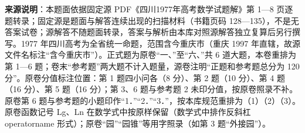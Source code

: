 


\begin{gktip}
\textbf{来源说明}：本题面依据固定源 PDF《四川1977年高考数学试题解》第 1—8 页逐题转录；固定源是题面与解答连续出现的扫描材料（书籍页码 128—135），不是无答案试卷；源解答不随题面转录，答案与解析由本库对照源解答独立复算后另行撰写。1977 年四川高考为全省统一命题，范围含今重庆市（重庆 1997 年直辖，故源文件名标注“含今重庆市”）。正式题为原卷“一、”至“六、”共 6 道大题，本卷重排为第 1—6 题；卷末“参考题”两大题不计入题量，源卷注明“正题和参考题总分为 120 分”。原卷分值标注位置：第 1 题四小问各（8 分）、第 2 题（10 分）、第 4 题（16 分）、第 5 题（16 分）；第 3、6 题与参考题 2 未印分值，按原卷照录不补。原卷第 6 题与参考题的小题印作“1．”“2．”“3．”，按本库规范重排为（1）（2）（3）。原卷函数记号 Lg、Ln 在数学式中按原样保留（数学式中排作反斜杠 operatorname 形式）；原卷“园”“园锥”等用字照录（如第 3 题“外接园”）。
\end{gktip}

\par\medskip


